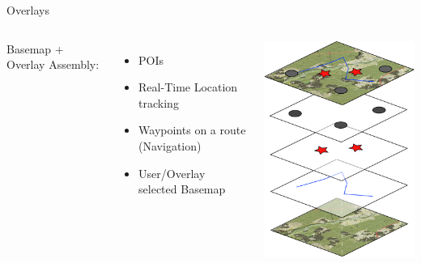 \documentclass{beamer}
\begin{document}
\begin{frame}{Overlays}
 \begin{columns}
   \linebreak
   \linebreak
   Basemap + Overlay Assembly:
   \vspace{1.5em}
   \begin{itemize}
    \itemsep 1.5em
    \item POIs
    \item Real-Time Location tracking
    \item Waypoints on a route (Navigation)
    \item User/Overlay selected Basemap
   \end{itemize}
   \linebreak
   \linebreak
   \linebreak
   \includegraphics[scale=0.5]{images/overlay_layers}
 \end{columns}
\end{frame}
\end{document}

